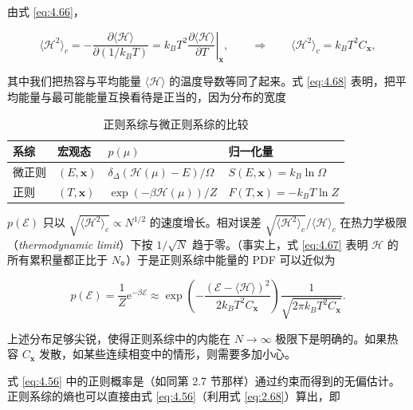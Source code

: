由式 \eqref{eq:4.66}，

\begin{equation}\label{eq:4.68}
  \langle\mathscr H^2\rangle_c=-\frac{\partial\langle\mathscr H\rangle}{\partial(1/k_BT)}=k_BT^2\left.\frac{\partial\langle\mathscr H\rangle}{\partial T}\right|_{\mathbf x},\qquad\Longrightarrow\qquad \langle\mathscr H^2\rangle_c=k_BT^2C_{\mathbf x},
\end{equation}

其中我们把热容与平均能量 $\langle\mathscr H\rangle$ 的温度导数等同了起来。式 \eqref{eq:4.68} 表明，把平均能量与最可能能量互换看待是正当的，因为分布的宽度

\begin{table}[htbp]
  \centering
  \small
  \caption{正则系综与微正则系综的比较}
  \label{tab:4.1}
  \begin{tabular}{@{}llll@{}}
    \toprule
    系综 & 宏观态 & $p(\mu)$ & 归一化量\\
    \midrule
    微正则 & $(E,\mathbf x)$ & $\delta_\Delta\left(\mathscr H(\mu)-E\right)/\Omega$ & $S(E,\mathbf x)=k_B\ln\Omega$\\
    正则 & $(T,\mathbf x)$ & $\exp\left(-\beta\mathscr H(\mu)\right)/Z$ & $F(T,\mathbf x)=-k_BT\ln Z$\\
    \bottomrule
  \end{tabular}
\end{table}

$p(\mathcal{E})$ 只以 $\sqrt{\langle\mathscr H^2\rangle_c}\propto N^{1/2}$ 的速度增长。相对误差 $\sqrt{\langle\mathscr H^2\rangle_c}/\langle\mathscr H\rangle_c$ 在热力学极限（\textit{thermodynamic limit}）下按 $1/\sqrt N$ 趋于零。（事实上，式 \eqref{eq:4.67} 表明 $\mathscr H$ 的所有累积量都正比于 $N$。）于是正则系综中能量的 PDF 可以近似为

\begin{equation}\label{eq:4.69}
  p(\mathcal{E})=\frac{1}{Z}\mathrm{e}^{-\beta\mathcal{E}}\approx\exp\left(-\frac{(\mathcal{E}-\langle\mathscr H\rangle)^2}{2k_BT^2C_{\mathbf x}}\right)\frac{1}{\sqrt{2\pi k_BT^2C_{\mathbf x}}}.
\end{equation}

上述分布足够尖锐，使得正则系综中的内能在 $N\to\infty$ 极限下是明确的。如果热容 $C_{\mathbf x}$ 发散，如某些连续相变中的情形，则需要多加小心。

式 \eqref{eq:4.56} 中的正则概率是（如同第 2.7 节那样）通过约束而得到的无偏估计。正则系综的熵也可以直接由式 \eqref{eq:4.56}（利用式 \eqref{eq:2.68}）算出，即

